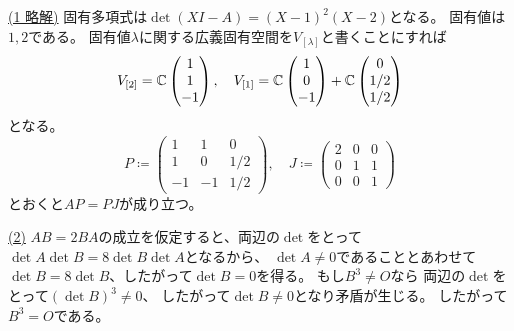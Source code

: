 \documentclass[report]{jlreq}
\begin{document}
\begin{answer}
    \uline{(1 略解)} \quad
    固有多項式は$\det (XI - A) = (X - 1)^2 (X - 2)$となる。
    固有値は$1, 2$である。
    固有値$\lambda$に関する広義固有空間を$V_{[\lambda]}$と書くことにすれば
    \begin{equation}
        V_{[2]} = \mathbb{C} \begin{pmatrix} 1 \\ 1 \\ -1 \end{pmatrix},
            \quad
            V_{[1]}
                = \mathbb{C} \begin{pmatrix} 1 \\ 0 \\ -1 \end{pmatrix}
                + \mathbb{C} \begin{pmatrix} 0 \\ 1/2 \\ 1/2 \end{pmatrix}
    \end{equation}
    となる。
    \begin{equation}
        P \coloneqq \begin{pmatrix}
            1 & 1 & 0 \\
            1 & 0 & 1/2 \\
            -1 & -1 & 1/2
        \end{pmatrix},
            \quad
            J \coloneqq \begin{pmatrix}
                2 & 0 & 0 \\
                0 & 1 & 1 \\
                0 & 0 & 1
            \end{pmatrix}
    \end{equation}
    とおくと$AP = PJ$が成り立つ。

    \uline{(2)} \quad
    $AB = 2BA$の成立を仮定すると、両辺の$\det$をとって
    $\det A \det B = 8 \det B \det A$となるから、
    $\det A \neq 0$であることとあわせて
    $\det B = 8 \det B$、したがって$\det B = 0$を得る。
    もし$B^3 \neq O$なら
    両辺の$\det$をとって$(\det B)^3 \neq 0$、
    したがって$\det B \neq 0$となり矛盾が生じる。
    したがって$B^3 = O$である。


\end{answer}
\end{document}
